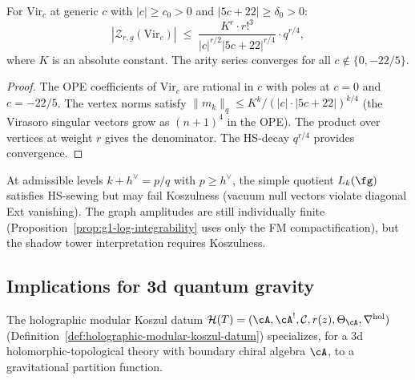 \begin{proposition}%
\label{prop:g1-virasoro-bound}%
%
For $\mathrm{Vir}_c$ at generic $c$ with $|c| \geq c_0 > 0$
and $|5c + 22| \geq \delta_0 > 0$:
\begin{equation}\label{eq:g1-virasoro-bound}
|\mathcal{Z}_{r,g}(\mathrm{Vir}_c)|
\;\leq\;
\frac{K^r \cdot r!^3}{|c|^{r/2} |5c{+}22|^{r/4}}
\cdot q^{r/4},
\end{equation}
where $K$ is an absolute constant.  The arity series converges
for all $c \notin \{0, -22/5\}$.
\end{proposition}

\begin{proof}
The OPE coefficients of $\mathrm{Vir}_c$ are rational in $c$
with poles at $c = 0$ and $c = -22/5$.  The vertex norms satisfy
$\|m_k\|_q \leq K^k/(|c| \cdot |5c+22|)^{k/4}$ (the
Virasoro singular vectors grow as $(n+1)^4$ in the OPE).
The product over vertices at weight $r$ gives the denominator.
The HS-decay $q^{r/4}$ provides convergence.
\end{proof}

\begin{remark}%
\label{rem:g1-admissible}%
%
At admissible levels $k + h^\vee = p/q$ with $p \geq h^\vee$,
the simple quotient $L_k(\fg)$ satisfies HS-sewing but may fail
Koszulness (vacuum null vectors violate diagonal Ext vanishing).
The graph amplitudes are still individually finite
(Proposition~\ref{prop:g1-log-integrability} uses only the FM
compactification), but the shadow tower interpretation requires
Koszulness.
\end{remark}

%
%

\subsection{Implications for 3d quantum gravity}
\label{subsec:thqg-I-3d-gravity}

The holographic modular Koszul datum
$\mathcal{H}(T) = (\cA, \cA^!, \mathcal{C}, r(z),
\Theta_\cA, \nabla^{\mathrm{hol}})$
(Definition~\ref{def:holographic-modular-koszul-datum})
specializes, for a 3d holomorphic-topological theory with
boundary chiral algebra $\cA$, to a gravitational
partition function.

